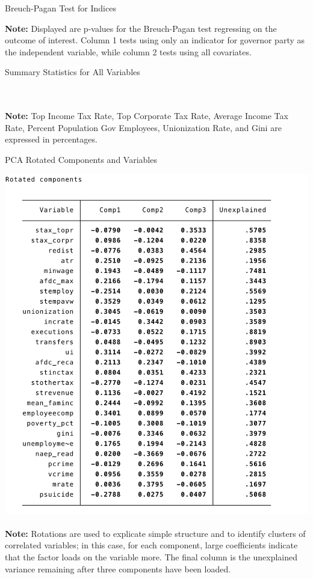 \documentclass{article}
\begin{document}
\begin{table}[!hbtp]
\caption{Breuch-Pagan Test for Indices}

\textbf{Note:} Displayed are p-values for the Breuch-Pagan test regressing on the outcome of interest. Column 1 tests using only an indicator for governor party as the independent variable, while column 2 tests using all covariates. 
\label{table:bp_index}
\end{table}


\begin{table}[!hbtp]
\caption{Summary Statistics for All Variables}

\\ \\
\textbf{Note:}  Top Income Tax Rate, Top Corporate Tax Rate, Average Income Tax Rate, Percent Population  Gov Employees, Unionization Rate, and Gini are expressed in percentages.
\label{table:summary_long}
\end{table}

\begin{table}[!hbtp]
\caption{PCA Rotated Components and Variables}
\includegraphics[width=15cm]{output/tables/pca_rotated_vars}
\\ \\
\textbf{Note:} Rotations are used to explicate simple structure and to identify clusters of correlated variables; in this case, for each component, large coefficients indicate that the factor loads on the variable more. The final column is the unexplained variance remaining after three components have been loaded.
\label{table:pca_rotated_vars}
\end{table}
\end{document}
